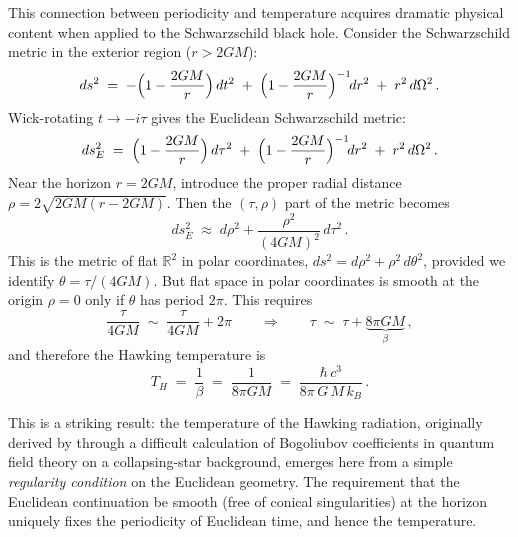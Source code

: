 \documentclass[11pt,letterpaper]{article}
\theoremstyle{plain}
\theoremstyle{definition}
\theoremstyle{remark}
\begin{document}
This connection between periodicity and temperature acquires dramatic physical
content when applied to the Schwarzschild black hole.  Consider the
Schwarzschild metric in the exterior region ($r > 2GM$):
\begin{equation}\label{eq05:schwarzschild}
  ds^2 \;=\; -\Bigl(1 - \frac{2GM}{r}\Bigr)\,dt^2
  \;+\; \Bigl(1 - \frac{2GM}{r}\Bigr)^{-1}\!dr^2
  \;+\; r^2\,d\Omega^2\,.
\end{equation}
Wick-rotating $t \to -i\tau$ gives the Euclidean Schwarzschild metric:
\begin{equation}\label{eq05:euclidean_schwarzschild}
  ds^2_E \;=\; \Bigl(1 - \frac{2GM}{r}\Bigr)\,d\tau^2
  \;+\; \Bigl(1 - \frac{2GM}{r}\Bigr)^{-1}\!dr^2
  \;+\; r^2\,d\Omega^2\,.
\end{equation}
Near the horizon $r = 2GM$, introduce the proper radial distance
$\rho = 2\sqrt{2GM(r - 2GM)}$.  Then the $(\tau, \rho)$ part of the metric
becomes
\begin{equation}\label{eq05:near_horizon}
  ds^2_E \;\approx\; d\rho^2 + \frac{\rho^2}{(4GM)^2}\,d\tau^2\,.
\end{equation}
This is the metric of flat $\mathbb{R}^2$ in polar coordinates,
$ds^2 = d\rho^2 + \rho^2\,d\theta^2$, provided we identify
$\theta = \tau/(4GM)$.  But flat space in polar coordinates is smooth at the
origin $\rho = 0$ only if $\theta$ has period $2\pi$.  This requires
\begin{equation}\label{eq05:hawking_temperature_derivation}
  \frac{\tau}{4GM} \;\sim\; \frac{\tau}{4GM} + 2\pi
  \qquad\Longrightarrow\qquad
  \tau \;\sim\; \tau + \underbrace{8\pi GM}_{\displaystyle\beta}\,,
\end{equation}
and therefore the Hawking temperature is
\begin{equation}\label{eq05:hawking_temp}
  \boxed{
  T_H \;=\; \frac{1}{\beta} \;=\; \frac{1}{8\pi G M}
  \;=\; \frac{\hbar\, c^3}{8\pi\, G\, M\, k_B}\,.
  }
\end{equation}

This is a striking result: the temperature of the Hawking radiation, originally
derived by \citet{hawking1975} through a difficult calculation of Bogoliubov
coefficients in quantum field theory on a collapsing-star background, emerges
here from a simple \emph{regularity condition} on the Euclidean geometry.  The
requirement that the Euclidean continuation be smooth (free of conical
singularities) at the horizon uniquely fixes the periodicity of Euclidean time,
and hence the temperature.
\end{document}
